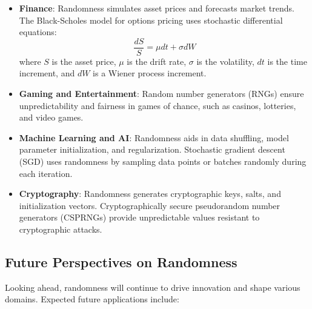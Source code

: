 \documentclass[12pt]{book} %
\begin{document}
\begin{itemize}
    \item \textbf{Finance}: Randomness simulates asset prices and forecasts market trends. The Black-Scholes model for options pricing uses stochastic differential equations:
    \[ \frac{dS}{S} = \mu dt + \sigma dW \]
    where \(S\) is the asset price, \(\mu\) is the drift rate, \(\sigma\) is the volatility, \(dt\) is the time increment, and \(dW\) is a Wiener process increment.
    
    \item \textbf{Gaming and Entertainment}: Random number generators (RNGs) ensure unpredictability and fairness in games of chance, such as casinos, lotteries, and video games.
    
    \item \textbf{Machine Learning and AI}: Randomness aids in data shuffling, model parameter initialization, and regularization. Stochastic gradient descent (SGD) uses randomness by sampling data points or batches randomly during each iteration.
    
    \item \textbf{Cryptography}: Randomness generates cryptographic keys, salts, and initialization vectors. Cryptographically secure pseudorandom number generators (CSPRNGs) provide unpredictable values resistant to cryptographic attacks.
\end{itemize}

\subsection{Future Perspectives on Randomness}

Looking ahead, randomness will continue to drive innovation and shape various domains. Expected future applications include:
\end{document}
